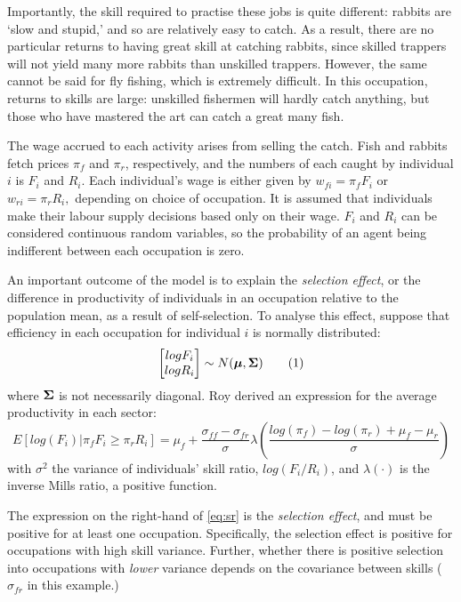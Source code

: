 Importantly, the skill required to practise these jobs is quite different: rabbits are `slow and stupid,' and so are relatively easy to catch. As a result, there are no particular returns to having great skill at catching rabbits, since skilled trappers will not yield many more rabbits than unskilled trappers. However, the same cannot be said for fly fishing, which is extremely difficult. In this occupation, returns to skills are large: unskilled fishermen will hardly catch anything, but those who have mastered the art can catch a great many fish.

The wage accrued to each activity arises from selling the catch. Fish and rabbits fetch prices $\pi_f$ and $\pi_r$, respectively, and the numbers of each caught by individual $i$ is $F_i$ and $R_i$. Each individual's wage is either given by $w_{fi} = \pi_fF_i$ or $w_{ri}=\pi_rR_i,$ depending on choice of occupation. It is assumed that individuals make their labour supply decisions based only on their wage. $F_i$ and $R_i$ can be considered continuous random variables, so the probability of an agent being indifferent between each occupation is zero.

An important outcome of the model is to explain the {\em selection effect}, or the difference in productivity of individuals in an occupation relative to the population mean, as a result of self-selection. To analyse this effect, suppose that efficiency in each occupation for individual $i$ is normally distributed:
\begin{equation}
 \begin{bmatrix}log{F_i} \\ log{R_i}\end{bmatrix} \sim N(\boldsymbol{\mu}, \mathbf{\Sigma}) 
 \label{eq:dist}\tag{1}
\end{equation}
where $\mathbf{\Sigma}$ is not necessarily diagonal. Roy derived an expression for the average productivity in each sector:
\begin{equation}
 E\left[ log(F_i) | \pi_fF_i \geq \pi_rR_i \right]
   = \mu_f + \frac{\sigma_{ff} - \sigma_{fr}}{\sigma}
     \lambda\left(
       \frac{log(\pi_f) - log(\pi_r) + \mu_f - \mu_r}{\sigma}
       \right)
\label{eq:sr}\tag{2}
\end{equation}
with $\sigma^2$ the variance of individuals' skill ratio, $log(F_i/R_i)$, and $\lambda(\cdot)$ is the inverse Mills ratio, a positive function. 

The expression on the right-hand of \eqref{eq:sr} is the {\em selection effect}, and must be positive for at least one occupation. Specifically, the selection effect is positive for occupations with high skill variance. Further, whether there is positive selection into occupations with {\em lower} variance depends on the covariance between skills ($\sigma_{fr}$ in this example.)

